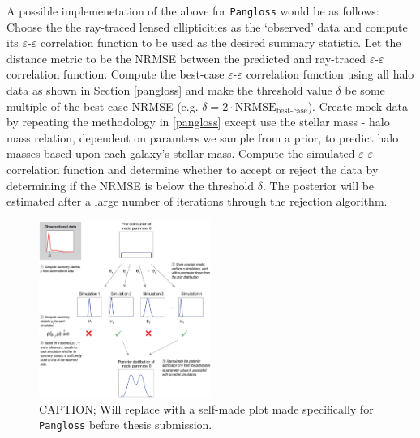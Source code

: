 \documentclass[%
 reprint,
 amsmath,amssymb,
 aps,nofootinbib
]{revtex4-1}
\begin{document}
A possible implemenetation of the above for \texttt{Pangloss} would be as follows: Choose the the ray-traced lensed ellipticities as the `observed' data and compute its $\varepsilon$-$\varepsilon$ correlation function to be used as the desired summary statistic. Let the distance metric to be the NRMSE between the predicted and ray-traced $\varepsilon$-$\varepsilon$ correlation function. Compute the best-case $\varepsilon$-$\varepsilon$ correlation function using all halo data as shown in Section \ref{pangloss} and make the threshold value $\delta$ be some multiple of the best-case NRMSE (e.g. ${\delta=2\cdot\text{NRMSE}_{\text{best-case}}}$). Create mock data by repeating the methodology in \ref{pangloss} except use the stellar mass - halo mass relation, dependent on paramters we sample from a prior, to predict halo masses based upon each galaxy's stellar mass. Compute the simulated $\varepsilon$-$\varepsilon$ correlation function and determine whether to accept or reject the data by determining if the NRMSE is below the threshold $\delta$. The posterior will be estimated after a large number of iterations through the rejection algorithm.

\begin{figure}
    \centering
    \includegraphics[width=0.5\textwidth]{figs-swe/thesis/abc.png}
    \captionsetup{justification=raggedright,singlelinecheck=false}
    \caption{CAPTION; Will replace with a self-made plot made specifically for \texttt{Pangloss} before thesis submission.}
    \label{fig:abc}
\end{figure}
\end{document}

